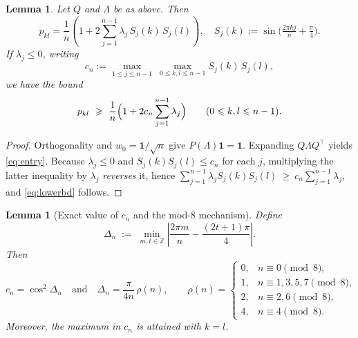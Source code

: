 \documentclass[12pt,fleqn]{amsart}
\renewcommand{\le}{\leqslant}
\renewcommand{\ge}{\geqslant}
\newtheorem{lem}[thm]{Lemma}
\theoremstyle{definition}
\theoremstyle{remark}
\newcommand{\1}{\mathbf{1}}
\newcommand{\Lam}{\Lambda}
\begin{document}
\begin{lem}\label{lem:entrybound}
Let $Q$ and $\Lam$ be as above. Then
\begin{equation}\label{eq:entry}
p_{kl}
=\frac1n\!\left(1+2\sum_{j=1}^{n-1}\lambda_j\,S_j(k)\,S_j(l)\right),
\quad
S_j(k):=\sin\!\Big(\tfrac{2\pi kj}{n}+\tfrac{\pi}{4}\Big).
\end{equation}
If $\lambda_j\le 0$, writing
\[
c_n:=\max_{1\le j\le n-1}\ \max_{0\le k,l\le n-1} S_j(k)\,S_j(l),
\]
we have the bound
\begin{equation}\label{eq:lowerbd}
p_{kl}\ \ge\ \frac1n\Bigl(1+2c_n\sum_{j=1}^{n-1}\lambda_j\Bigr)\qquad(0 \le k, l \le n-1).
\end{equation}
\end{lem}

\begin{proof}
Orthogonality and $w_0=\1/\sqrt n$ give $P(\Lam)\1=\1$. Expanding $Q\Lam Q^\top$ yields \eqref{eq:entry}. Because $\lambda_j\le0$ and $S_j(k)S_j(l)\le c_n$ for each $j$, multiplying the latter inequality by $\lambda_j$ \emph{reverses} it, hence
\(
\sum_{j=1}^{n-1}\lambda_j S_j(k)S_j(l)\ \ge\ c_n\sum_{j=1}^{n-1}\lambda_j,
\)
and \eqref{eq:lowerbd} follows.
\end{proof}

\begin{lem}[Exact value of $c_n$ and the mod-$8$ mechanism]\label{lem:cn}
Define
\[
\Delta_n \;:=\; \min_{m,t\in\mathbb Z}\left|\frac{2\pi m}{n}-\frac{(2t+1)\pi}{4}\right|.
\]
Then
\[
c_n=\cos^2\Delta_n
\quad\text{and}\quad
\Delta_n=\frac{\pi}{4n}\,\rho(n),
\qquad
\rho(n)=
\begin{cases}
0,& n\equiv0\pmod{8},\\
1,& n\equiv1,3,5,7\pmod{8},\\
2,& n\equiv2,6\pmod{8},\\
4,& n\equiv4\pmod{8}.
\end{cases}
\]
Moreover, the maximum in $c_n$ is attained with $k=l$.
\end{lem}
\end{document}
